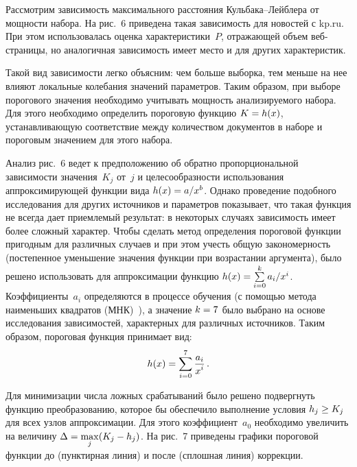 \begin{multicols}{2}
  Рассмотрим зависимость максимального расстояния 
  Куль\-ба\-ка--Лейб\-ле\-ра от мощности набора. На рис.~6 приведена такая 
зависимость для новостей с {\sf kp.ru}. При этом использовалась оценка 
характеристики~$P$, отражающей объем веб-стра\-ни\-цы, но аналогичная 
зависимость имеет место и для других характеристик. 
  


    Такой вид зависимости легко объясним: чем больше выборка, тем меньше на 
нее влияют локальные колебания значений параметров. Таким образом, при 
выборе порогового значения необходимо учитывать мощность анализируемого 
набора. Для этого необходимо определить пороговую функцию $K\hm = h(x)$, 
устанавливающую соответствие между количеством документов в наборе и 
пороговым значением для этого набора. 
  
    Анализ рис.~6 ведет к предположению об обратно пропорциональной 
зависимости значения~$K_j$ от~$j$ и целесообразности использования 
аппроксимирующей функции вида $h(x)\hm=a/x^b$. Однако проведение 
подобного исследования для других источников и параметров показывает, что 
такая функция не всегда дает приемлемый результат: в некоторых случаях 
зависимость имеет более сложный характер. Чтобы сделать метод определения 
пороговой функции пригодным для различных случаев и при этом учесть 
общую закономерность (постепенное уменьшение значения функции при 
воз\-рас\-та\-нии
 аргумента), было решено использовать для аппроксимации 
функцию $h(x)\hm= \sum\limits_{i=0}^k a_i/x^i$. Коэффициенты~$a_i$ 
определяются в процессе обучения (с по\-мощью метода наименьших 
квадратов (МНК)~\cite{21-and}), а значение $k\hm = 7$ было выбрано на основе 
исследования зависимостей, характерных для различных источников. Таким 
образом, пороговая функция принимает вид:
  $$
  h(x)=\sum\limits_{i=0}^7 \displaystyle\frac{\displaystyle a_i\mathstrut}{\displaystyle x^i\mathstrut}\,.
  $$
  




  
  Для минимизации числа ложных срабатываний было решено подвергнуть 
функцию преобразованию, которое бы обеспечило выполнение условия 
$h_j\hm\geq K_j$ для всех узлов аппроксимации. Для этого коэффициент~$a_0$ 
необходимо увеличить на величину $\Delta\hm= \max\limits_j(K_j-h_j)$. На 
рис.~7 приведены графики пороговой функции до (пунктирная линия) и после 
(сплошная линия) коррекции.
  
  \begin{figure*}[b] %
 \begin{center}
 \mbox{%
 \epsfxsize=113.506mm
 }
 \end{center}
 \vspace*{-6pt}
  \end{figure*}
  

\end{multicols}
